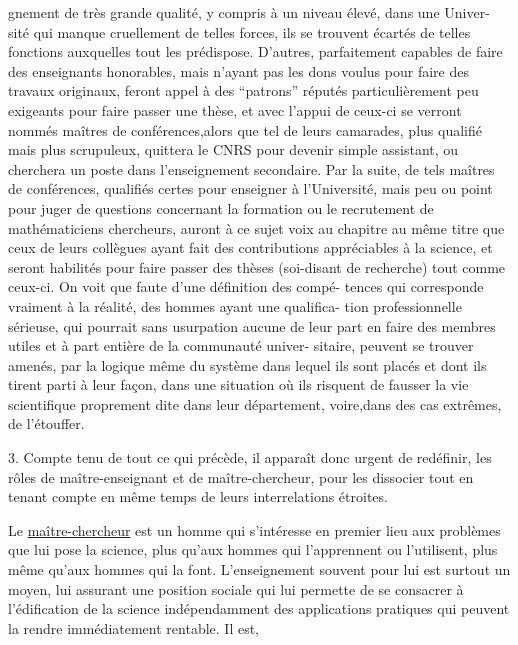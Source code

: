
gnement de très grande qualité, y compris à un niveau élevé, dans une Univer-%
sité qui manque cruellement de telles forces, ils se trouvent écartés de telles
fonctions auxquelles tout les prédispose. D'autres, parfaitement capables de
faire des enseignants honorables, mais n'ayant pas les dons voulus pour faire
des travaux originaux, feront appel à des ``patrons'' réputés particulièrement
peu exigeants pour faire passer une thèse, et avec l'appui de ceux-ci se
verront nommés maîtres de conférences,alors que tel de leurs camarades, plus
qualifié mais plus scrupuleux, quittera le CNRS pour devenir simple assistant,
ou cherchera un poste dans l'enseignement secondaire. Par la suite, de tels
maîtres de conférences, qualifiés certes pour enseigner à l'Université, mais
peu ou point pour juger de questions concernant la formation ou le recrutement
de mathématiciens chercheurs, auront à ce sujet voix au chapitre au même
titre que ceux de leurs collègues ayant fait des contributions appréciables
à la science, et seront habilités pour faire passer des thèses (soi-disant de
recherche) tout comme ceux-ci. On voit que faute d'une définition des compé-%
tences qui corresponde vraiment à la réalité, des hommes ayant une qualifica-%
tion professionnelle sérieuse, qui pourrait sans usurpation aucune de leur
part en faire des membres utiles et à part entière de la communauté univer-%
sitaire, peuvent se trouver amenés, par la logique même du système dans
lequel ils sont placés et dont ils tirent parti à leur façon, dans une
situation où ils risquent de fausser la vie scientifique proprement dite
dans leur département, voire,dans des cas extrêmes, de l'étouffer.

3. Compte tenu de tout ce qui précède, il apparaît donc urgent de redéfinir,
les rôles de maître-enseignant et de maître-chercheur, pour les dissocier
tout en tenant compte en même temps de leurs interrelations étroites.

Le \uline{maître-chercheur} est un homme qui s'intéresse en premier lieu
aux problèmes que lui pose la science, plus qu'aux hommes qui l'apprennent
ou l'utilisent, plus même qu'aux hommes qui la font. L'enseignement souvent
pour lui est surtout un moyen, lui assurant une position sociale qui lui
permette de se consacrer à l'édification de la science indépendamment des
applications pratiques qui peuvent la rendre immédiatement rentable. Il est,

